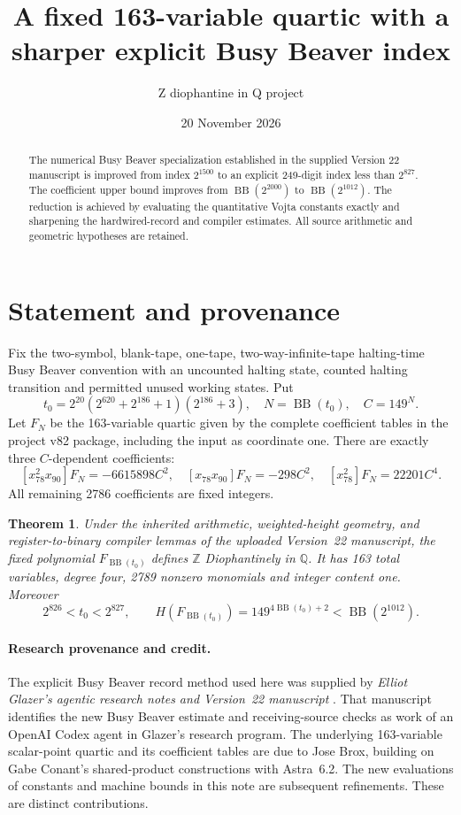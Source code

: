 \documentclass[11pt]{article}
\title{A fixed 163-variable quartic with a sharper explicit Busy Beaver index}
\author{Z diophantine in Q project}
\date{20 November 2026}
\newtheorem{theorem}{Theorem}
\newcommand{\Q}{\mathbb Q}
\newcommand{\Z}{\mathbb Z}
\newcommand{\BB}{\operatorname{BB}}
\begin{document}
\maketitle
\begin{abstract}
The numerical Busy Beaver specialization established in the supplied
Version 22 manuscript is improved from index \(2^{1500}\) to an explicit
249-digit index less than \(2^{827}\). The coefficient upper bound
improves from \(\BB(2^{2000})\) to \(\BB(2^{1012})\).
The reduction is achieved by evaluating the quantitative Vojta constants
exactly and sharpening the hardwired-record and compiler estimates.
All source arithmetic and geometric hypotheses are retained.
\end{abstract}

\section{Statement and provenance}
Fix the two-symbol, blank-tape, one-tape, two-way-infinite-tape
halting-time Busy Beaver convention with an uncounted halting state,
counted halting transition and permitted unused working states.
Put
\[
t_0=2^{20}(2^{620}+2^{186}+1)(2^{186}+3),\quad
N=\BB(t_0),\quad C=149^N.
\]
Let \(F_N\) be the 163-variable quartic given by the complete coefficient
tables in the project v82 package, including the input as coordinate one.
There are exactly three \(C\)-dependent coefficients:
\[
[x_{78}^2x_{90}]F_N=-6615898C^2,\quad
[x_{78}x_{90}]F_N=-298C^2,\quad
[x_{78}^2]F_N=22201C^4.
\]
All remaining 2786 coefficients are fixed integers.

\begin{theorem}\label{thm:main}
Under the inherited arithmetic, weighted-height geometry, and
register-to-binary compiler lemmas of the uploaded Version~22
manuscript, the fixed polynomial \(F_{\BB(t_0)}\)
defines \(\Z\) Diophantinely in \(\Q\).
It has 163 total variables, degree four, 2789 nonzero monomials and
integer content one. Moreover
\[
2^{826}<t_0<2^{827},\qquad
H(F_{\BB(t_0)})=149^{4\BB(t_0)+2}<\BB(2^{1012}).
\]
\end{theorem}

\paragraph{Research provenance and credit.}
The explicit Busy Beaver record method used here was supplied by
\emph{Elliot Glazer's agentic research notes and Version~22 manuscript}
\cite{v22}. That manuscript identifies the new Busy Beaver estimate
and receiving-source checks as work of an OpenAI Codex agent in
Glazer's research program. The underlying 163-variable scalar-point
quartic and its coefficient tables are due to Jose Brox, building
on Gabe Conant's shared-product constructions with Astra~6.2.
The new evaluations of constants and machine bounds in this note
are subsequent refinements. These are distinct contributions.
\end{document}
